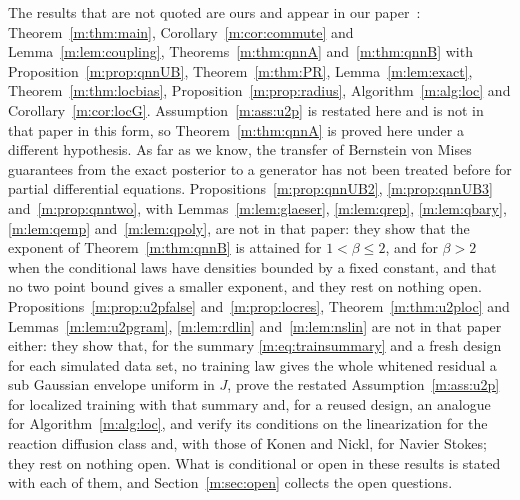 The results that are not quoted are ours and appear in our paper~\cite{polsonsokolov2026manifold}: Theorem~\ref{m:thm:main}, Corollary~\ref{m:cor:commute} and Lemma~\ref{m:lem:coupling}, Theorems~\ref{m:thm:qnnA} and~\ref{m:thm:qnnB} with Proposition~\ref{m:prop:qnnUB}, Theorem~\ref{m:thm:PR}, Lemma~\ref{m:lem:exact}, Theorem~\ref{m:thm:locbias}, Proposition~\ref{m:prop:radius}, Algorithm~\ref{m:alg:loc} and Corollary~\ref{m:cor:locG}. Assumption~\ref{m:ass:u2p} is restated here and is not in that paper in this form, so Theorem~\ref{m:thm:qnnA} is proved here under a different hypothesis. As far as we know, the transfer of Bernstein von Mises guarantees from the exact posterior to a generator has not been treated before for partial differential equations. Propositions~\ref{m:prop:qnnUB2}, \ref{m:prop:qnnUB3} and~\ref{m:prop:qnntwo}, with Lemmas~\ref{m:lem:glaeser}, \ref{m:lem:qrep}, \ref{m:lem:qbary}, \ref{m:lem:qemp} and~\ref{m:lem:qpoly}, are not in that paper: they show that the exponent of Theorem~\ref{m:thm:qnnB} is attained for $1<\beta\le2$, and for $\beta>2$ when the conditional laws have densities bounded by a fixed constant, and that no two point bound gives a smaller exponent, and they rest on nothing open. Propositions~\ref{m:prop:u2pfalse} and~\ref{m:prop:locres}, Theorem~\ref{m:thm:u2ploc} and Lemmas~\ref{m:lem:u2pgram}, \ref{m:lem:rdlin} and~\ref{m:lem:nslin} are not in that paper either: they show that, for the summary \eqref{m:eq:trainsummary} and a fresh design for each simulated data set, no training law gives the whole whitened residual a sub Gaussian envelope uniform in $J$, prove the restated Assumption~\ref{m:ass:u2p} for localized training with that summary and, for a reused design, an analogue for Algorithm~\ref{m:alg:loc}, and verify its conditions on the linearization for the reaction diffusion class and, with those of Konen and Nickl, for Navier Stokes; they rest on nothing open. What is conditional or open in these results is stated with each of them, and Section~\ref{m:sec:open} collects the open questions.
